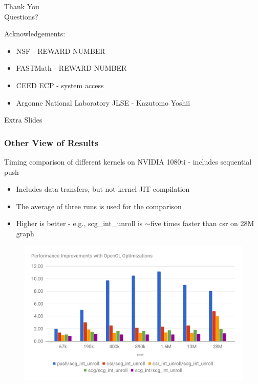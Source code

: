 \documentclass{beamer}
\begin{document}
\begin{frame}
  \begin{center}
    {\huge
      Thank You\\
      \bigskip
      \bigskip
      \bigskip
      \bigskip
      \bigskip
      \huge
      Questions?\\
      \bigskip
      \bigskip
      \bigskip
    }
  \end{center}
  \large
  Acknowledgements:\\
  \begin{itemize}
    \item NSF - REWARD NUMBER
    \item FASTMath - REWARD NUMBER
    \item CEED ECP - system access
    \item Argonne National Laboratory JLSE - Kazutomo Yoshii
  \end{itemize}
\end{frame}

\begin{frame}
  \center \huge Extra Slides
\end{frame}

\begin{frame}
  \frametitle{Other View of Results}
  \tiny
  Timing comparison of different kernels on NVIDIA 1080ti - includes sequential
  push
  \begin{itemize}
    \item Includes data transfers, but not kernel JIT compilation
    \item The average of three runs is used for the comparison
    \item Higher is better - e.g., scg\_int\_unroll is $\sim$five times faster than csr on 28M graph
  \end{itemize}
  \begin{figure}
    \centering
    \includegraphics[width=.9\textwidth]{results/bfs.png}
  \end{figure}  
\end{frame}
\end{document}
